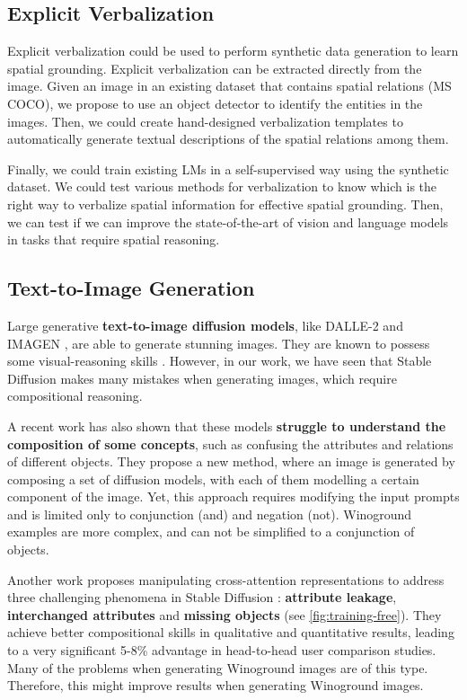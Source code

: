 \subsection{Explicit Verbalization} \label{sec:explicit_verbalization}

Explicit verbalization could be used to perform synthetic data generation to learn spatial grounding. Explicit verbalization can be extracted directly from the image. Given an image in an existing dataset that contains spatial relations (MS COCO), we propose to use an object detector to identify the entities in the images. Then, we could create hand-designed verbalization templates to automatically generate textual descriptions of the spatial relations among them.

Finally, we could train existing LMs in a self-supervised way using the synthetic dataset. We could test various methods for verbalization to know which is the right way to verbalize spatial information for effective spatial grounding. Then, we can test if we can improve the state-of-the-art of vision and language models in tasks that require spatial reasoning.

\subsection{Text-to-Image Generation} \label{sec:text-to-image}

Large generative \textbf{text-to-image diffusion models}, like DALLE-2 \cite{ramesh2022hierarchical} and IMAGEN \cite{saharia2022photorealistic}, are able to generate stunning images. They are known to possess some visual-reasoning skills \cite{cho2022dall}. However, in our work, we have seen that Stable Diffusion makes many mistakes when generating images, which require compositional reasoning.

A recent work \cite{liu2022compositional} has also shown that these models \textbf{struggle to understand the composition of some concepts}, such as confusing the attributes and relations of different objects. They propose a new method, where an image is generated by composing a set of diffusion models, with each of them modelling a certain component of the image. Yet, this approach requires modifying the input prompts and is limited only to conjunction (and) and negation (not). Winoground examples are more complex, and can not be simplified to a conjunction of objects.

Another work \cite{anonymous2023trainingfree} proposes manipulating cross-attention representations to address three challenging phenomena in Stable Diffusion \cite{rombach2021highresolution}: \textbf{attribute leakage}, \textbf{interchanged attributes} and \textbf{missing objects} (see \cref{fig:training-free}). They achieve better compositional skills in qualitative and quantitative results, leading to a very significant 5-8\% advantage in head-to-head user comparison studies. Many of the problems when generating Winoground images are of this type. Therefore, this might improve results when generating Winoground images.

